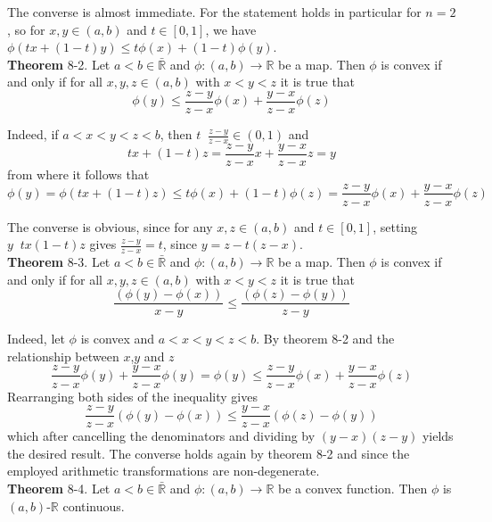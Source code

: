 \documentclass[a4paper]{article}
\newcommand{\clo}[1]{\left [ #1 \right ]}
\newcommand{\brac}[1]{\left ( #1 \right )}
\newcommand{\Rbar}{{\bar{\mathbb{R}}}}
\newcommand{\Real}{\mathbb{R}}
\newcommand{\defn}{\mathop{\overset{\Delta}{=}}\nolimits}
\begin{document}
The converse is almost immediate. For the statement holds in particular for $n=2$, so for $x, y\in \brac{a,b}$ and $t\in \clo{0,1}$, we have $\phi\brac{t x + \brac{1-t} y} \leq t \phi\brac{x} + \brac{1-t} \phi\brac{y}$.\\

\label{thm:convex_func2} \noindent \textbf{Theorem} 8-2.
Let $a<b\in \Rbar$ and $\phi:\brac{a, b}\to \Real$ be a map. Then $\phi$ is convex if and only if for all $x,y,z\in \brac{a,b}$ with $x<y<z$ it is true that \[\phi\brac{y} \leq \frac{z-y}{z-x}\phi\brac{x} + \frac{y-x}{z-x}\phi\brac{z}\]

Indeed, if $a<x<y<z<b$, then $t\defn \frac{z-y}{z-x} \in \brac{0,1}$ and \[t x + \brac{1-t} z = \frac{z-y}{z-x} x + \frac{y-x}{z-x} z = y \] from where it follows that \[\phi\brac{y} = \phi\brac{t x + \brac{1-t} z } \leq t \phi\brac{x} + \brac{1-t} \phi\brac{z} = \frac{z-y}{z-x} \phi\brac{x} + \frac{y-x}{z-x} \phi\brac{z}\]

The converse is obvious, since for any $x,z\in \brac{a,b}$ and $t\in \clo{0,1}$, setting $y\defn t x \brac{1-t} z$ gives $\frac{z-y}{z-x} = t$, since $y = z - t \brac{z-x}$.\\

\label{thm:convex_func3} \noindent \textbf{Theorem} 8-3.
Let $a<b\in \Rbar$ and $\phi:\brac{a, b}\to \Real$ be a map. Then $\phi$ is convex if and only if for all $x,y,z\in \brac{a,b}$ with $x<y<z$ it is true that \[\frac{\brac{\phi\brac{y}-\phi\brac{x}}}{x-y} \leq \frac{\brac{\phi\brac{z}-\phi\brac{y}}}{z-y}\]

Indeed, let $\phi$ is convex and $a<x<y<z<b$. By theorem 8-2 and the relationship between $x$,$y$ and $z$ \[\frac{z-y}{z-x} \phi\brac{y} + \frac{y-x}{z-x} \phi\brac{y} = \phi\brac{y} \leq \frac{z-y}{z-x}\phi\brac{x} + \frac{y-x}{z-x}\phi\brac{z}\] Rearranging both sides of the inequality gives \[\frac{z-y}{z-x}\brac{ \phi\brac{y} -\phi\brac{x} } \leq \frac{y-x}{z-x}\brac{ \phi\brac{z} -\phi\brac{y} } \] which after cancelling the denominators and dividing by $\brac{y-x}\brac{z-y}$ yields the desired result. The converse holds again by theorem 8-2 and since the employed arithmetic transformations are non-degenerate.\\

\label{thm:convex_func4} \noindent \textbf{Theorem} 8-4.
Let $a<b\in \Rbar$ and $\phi:\brac{a, b}\to \Real$ be a convex function. Then $\phi$ is $\brac{a, b}$-$\Real$ continuous.
\end{document}
